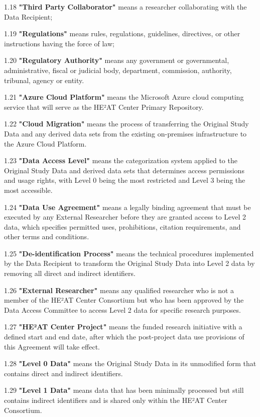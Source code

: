 \documentclass[12pt,letterpaper]{article}
\newcommand{\added}[1]{\textcolor{addcolor}{#1}}
\begin{document}
1.18 \textbf{"Third Party Collaborator"} means a researcher collaborating with the Data Recipient;

1.19 \textbf{"Regulations"} means rules, regulations, guidelines, directives, or other instructions having the force of law;

1.20 \textbf{"Regulatory Authority"} means any government or governmental, administrative, fiscal or judicial body, department, commission, authority, tribunal, agency or entity.

\added{1.21 \textbf{"Azure Cloud Platform"} means the Microsoft Azure cloud computing service that will serve as the HE²AT Center Primary Repository.}

\added{1.22 \textbf{"Cloud Migration"} means the process of transferring the Original Study Data and any derived data sets from the existing on-premises infrastructure to the Azure Cloud Platform.}

\added{1.23 \textbf{"Data Access Level"} means the categorization system applied to the Original Study Data and derived data sets that determines access permissions and usage rights, with Level 0 being the most restricted and Level 3 being the most accessible.}

\added{1.24 \textbf{"Data Use Agreement"} means a legally binding agreement that must be executed by any External Researcher before they are granted access to Level 2 data, which specifies permitted uses, prohibitions, citation requirements, and other terms and conditions.}

\added{1.25 \textbf{"De-identification Process"} means the technical procedures implemented by the Data Recipient to transform the Original Study Data into Level 2 data by removing all direct and indirect identifiers.}

\added{1.26 \textbf{"External Researcher"} means any qualified researcher who is not a member of the HE²AT Center Consortium but who has been approved by the Data Access Committee to access Level 2 data for specific research purposes.}

\added{1.27 \textbf{"HE²AT Center Project"} means the funded research initiative with a defined start and end date, after which the post-project data use provisions of this Agreement will take effect.}

\added{1.28 \textbf{"Level 0 Data"} means the Original Study Data in its unmodified form that contains direct and indirect identifiers.}

\added{1.29 \textbf{"Level 1 Data"} means data that has been minimally processed but still contains indirect identifiers and is shared only within the HE²AT Center Consortium.}
\end{document}
